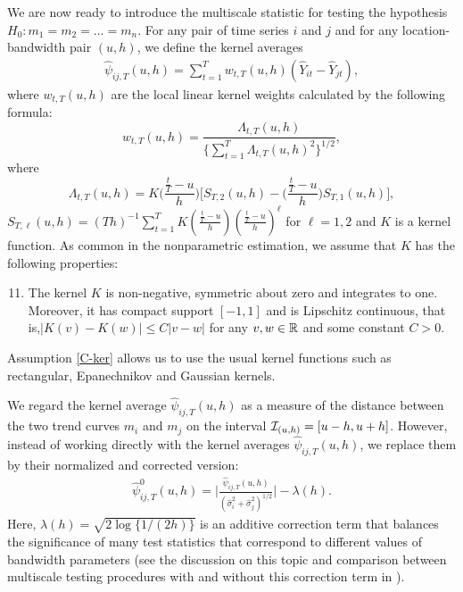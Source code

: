 \documentclass[a4paper,12pt]{article}
\begin{document}
We are now ready to introduce the multiscale statistic for testing the hypothesis \linebreak $H_0: m_1 = m_2 = \ldots = m_n$. For any pair of time series $i$ and $j$ and for any location-bandwidth pair $(u, h)$, we define the kernel averages
\begin{align}\label{eq:psi_hat_ij}
 \widehat{\psi}_{ij,T}(u,h) = \sum\limits_{t=1}^T w_{t,T}(u,h)(\widehat{Y}_{it} - \widehat{Y}_{jt}),
 \end{align}
where $w_{t,T}(u,h)$ are the local linear kernel weights calculated by the following formula:
\begin{equation}\label{eq:weights}
w_{t,T}(u,h) = \frac{\Lambda_{t,T}(u,h)}{ \{\sum\nolimits_{t=1}^T \Lambda_{t,T}(u,h)^2 \}^{1/2} }, 
\end{equation}
where
\[ \Lambda_{t,T}(u,h) = K\Big(\frac{\frac{t}{T}-u}{h}\Big) \Big[ S_{T,2}(u,h) - \Big(\frac{\frac{t}{T}-u}{h}\Big) S_{T,1}(u,h) \Big], \]
$S_{T,\ell}(u,h) = (Th)^{-1} \sum\nolimits_{t=1}^T K(\frac{\frac{t}{T}-u}{h}) (\frac{\frac{t}{T}-u}{h})^\ell$ for $\ell = 1,2$ and $K$ is a kernel function. As common in the nonparametric estimation, we assume that $K$ has the following properties: 
\begin{enumerate}[label=(C\arabic*),leftmargin=1.05cm]
\setcounter{enumi}{10}
\item \label{C-ker} The kernel $K$ is non-negative, symmetric about zero and integrates to one. Moreover, it has compact support $[-1,1]$ and is Lipschitz continuous, that is,\linebreak $|K(v) - K(w)| \le C |v-w|$ for any $v,w \in \mathbb{R}$ and some constant $C > 0$. 
\end{enumerate} 
Assumption \ref{C-ker} allows us to use the usual kernel functions such as rectangular, Epanechnikov and Gaussian kernels.

We regard the kernel average $\widehat{\psi}_{ij,T}(u,h)$ as a measure of the distance between the two trend curves $m_i$ and $m_j$ on the interval $\mathcal{I}_{(u, h)} = [u-h,u+h]$. However, instead of working directly with the kernel averages $\widehat{\psi}_{ij,T}(u,h)$, we replace them by their normalized and corrected version:
\begin{align}\label{eq:psi_zero_ij}
\hat{\psi}^0_{ij,T}(u, h) =  \Big|\frac{\widehat{\psi}_{ij,T}(u,h)}{(\widehat{\sigma}_i^2 + \widehat{\sigma}_j^2)^{1/2}}\Big| - \lambda(h).
\end{align}
Here, $\lambda(h) = \sqrt{2 \log \{ 1/(2h) \}}$ is an additive correction term that balances the significance of many test statistics that correspond to different values of bandwidth parameters (see the discussion on this topic and comparison between multiscale testing procedures with and without this correction term in \citet{KhismatullinaVogt2020}).
\end{document}
